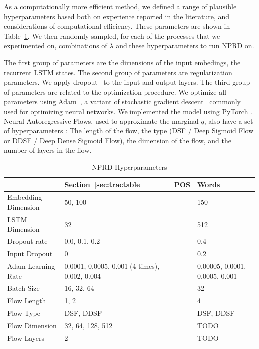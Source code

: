 \documentclass[11pt,letterpaper]{article}
\begin{document}
As a computationally more efficient method, we defined a range of plausible hyperparameters based both on experience reported in the literature, and considerations of computational efficiency.
These parameters are shown in Table~\ref{tab:nprd-hyperparameters}.
We then randomly sampled, for each of the processes that we experimented on, combinations of $\lambda$ and these hyperparameters to run NPRD on.

The first group of parameters are the dimensions of the input embedings, the recurrent LSTM states.
The second group of parameters are regularization parameters.
We apply dropout~\citep{srivastava-dropout:-2014} to the input and output layers.
The third group of parameters are related to the optimization procedure.
We optimize all parameters using Adam~\citep{kingma-adam:-2014}, a variant of stochastic gradient descent~\citep{robbins1951stochastic} commonly used for optimizing neural networks.
We implemented the model using PyTorch \citep{paszke2017automatic}.
Neural Autoregressive Flows, used to approximate the marginal $q$, also have a set of hyperparameters \citep{huang-neural-2018}: The length of the flow, the type (DSF / Deep Sigmoid Flow or  DDSF / Deep Dense Sigmoid Flow), the dimension of the flow, and the number of layers in the flow.


\begin{table}
\begin{tabular}{l||lll}
	& Section~\ref{sec:tractable} &   POS & Words\\ \hline\hline
	Embedding Dimension & 50, 100 &       &  150      \\
	LSTM Dimension & 32           &       &    512     \\ \hline
	Dropout rate & 0.0, 0.1, 0.2  &       &      0.4     \\
	Input Dropout & 0  &       &        0.2             \\ \hline
	Adam Learning Rate & 0.0001, 0.0005, 0.001 (4 times), 0.002, 0.004  &       &       0.00005, 0.0001, 0.0005, 0.001     \\
	Batch Size & 16, 32, 64  &       &       32          \\ \hline
	Flow Length & 1, 2  &       &          4              \\
	Flow Type & DSF, DDSF  &       &       DSF, DDSF             \\
	Flow Dimension & 32, 64, 128, 512  &       &    TODO        \\
	Flow Layers & 2  &       &                 TODO         \\
\end{tabular}
	\caption{NPRD Hyperparameters}\label{tab:nprd-hyperparameters}
\end{table}
\end{document}
